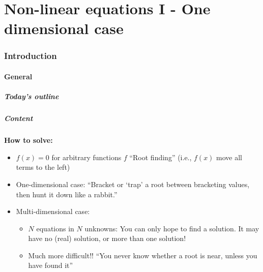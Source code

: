 \part{Non-linear equations I - One dimensional case}
\section{Introduction}
\subsection{General}
\begin{frame}[label=contents_integration]
  \frametitle{Today's outline}
\end{frame}

\begin{frame}[fragile]
    \frametitle{Content}
  
    \textbf{How to solve:}
    \begin{itemize}
      \item \(f(x) = 0\) for arbitrary functions \(f\) “Root finding” (i.e., \(f(x)\) move all terms to the left)
      \item One-dimensional case: “Bracket or ‘trap’ a root between bracketing values, then hunt it down like a rabbit.”
      \item Multi-dimensional case:
      \begin{itemize}
        \item \(N\) equations in \(N\) unknowns: You can only hope to find a solution. It may have no (real) solution, or more than one solution!
        \item Much more difficult!! “You never know whether a root is near, unless you have found it”
      \end{itemize}
    \end{itemize}
  \end{frame}
  
